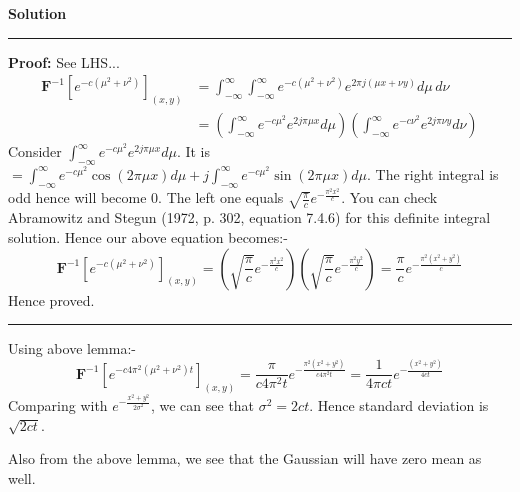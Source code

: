 \documentclass[a4paper]{article}
\newenvironment{solution}[2][]{%
    \begin{mdframed}[linecolor=green!60!black, linewidth=2pt, roundcorner=10pt, backgroundcolor=green!5!white, skipabove=12pt, skipbelow=12pt]%
        \textbf{\large #2} %
        \par\noindent\rule{\textwidth}{0.4pt} %
        \vspace{0.5em} %
}{%
    \end{mdframed}%
}
\begin{document}
\begin{solution}{Solution}
	\textbf{Proof:} See LHS...
	\begin{align*}
		\mathbf{F}^{-1} [e^{-c(\mu^2 + \nu^2)}]_{(x,y)} &= \int_{- \infty}^{\infty} \int_{- \infty}^{\infty} e^{-c(\mu^2 + \nu^2)} e^{2 \pi j (\mu x + \nu y)} d\mu \, d\nu \\
		&= \left( \int_{- \infty}^{\infty} e^{-c \mu^2} e^{2 j \pi \mu x} d \mu \right) \left( \int_{- \infty}^{\infty} e^{-c \nu^2} e^{2 j \pi \nu y} d \nu \right)
	\end{align*}
	Consider $\int_{- \infty}^{\infty} e^{-c \mu^2} e^{2 j \pi \mu x} d \mu$. It is $= \int_{- \infty}^{\infty} e^{-c \mu^2} \cos (2 \pi \mu x) d \mu + j \int_{- \infty}^{\infty} e^{-c \mu^2} \sin (2 \pi \mu x) d \mu$. The right integral is odd hence will become 0. The left one equals $\sqrt{\frac{\pi}{c}} e^{-\frac{\pi^2 x^2}{c}}$. You can check Abramowitz and Stegun (1972, p. 302, equation 7.4.6) for this definite integral solution. Hence our above equation becomes:-
	\[
		\mathbf{F}^{-1} [e^{-c(\mu^2 + \nu^2)}]_{(x,y)} = \left(\sqrt{\frac{\pi}{c}} e^{-\frac{\pi^2 x^2}{c}}\right) \left(\sqrt{\frac{\pi}{c}} e^{-\frac{\pi^2 y^2}{c}}\right) = \frac{\pi}{c} e^{-\frac{\pi^2(x^2 + y^2)}{c}}
	\]
	Hence proved.
	\vspace{5pt}
	\hrule
	\vspace{5pt}
	Using above lemma:-
	\[
		\mathbf{F}^{-1} [e^{-c 4 \pi^2(\mu^2 + \nu^2) t}]_{(x,y)} = \frac{\pi}{c 4 \pi^2 t} e^{-\frac{\pi^2 (x^2 + y^2)}{c 4 \pi^2 t}} = \frac{1}{4 \pi c t} e^{-\frac{(x^2 + y^2)}{4ct}}
	\]
	Comparing with $e^{-\frac{x^2+y^2}{2 \sigma^2}}$, we can see that $\sigma^2 = 2ct$. Hence standard deviation is $\sqrt{2ct}$.

	Also from the above lemma, we see that the Gaussian will have zero mean as well.
\end{solution}
\end{document}
